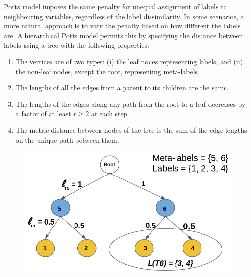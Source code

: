 \label{subsec:hier_potts}

Potts model imposes the same penalty for unequal assignment of labels to
neighbouring variables, regardless of the label dissimilarity. In some
scenarios, a more natural approach is to vary the penalty based on how different the labels are. A hierarchical Potts model permits this by specifying the distance between labels using a tree with the following properties:
\vspace{2mm}
\begin{enumerate}
  \itemsep+1em 
\item The vertices are of two types: (i) the leaf nodes representing labels, and (ii) the non-leaf nodes, except the root, representing meta-labels.
\item The lengths of all the edges from a parent to its children are the same.
\item The lengths of the edges along any path from the root to a leaf decreases by a factor of at least $r \geq 2$ at each step.
\item The metric distance between nodes of the tree is the sum of the edge lengths on the unique path between them. 
\end{enumerate}
\vspace{2mm}
%
\begin{figure}
\centering
\includegraphics[scale = 0.35]{./figures/rhst_notation.png}
\label{fig:rhst}
\end{figure}

